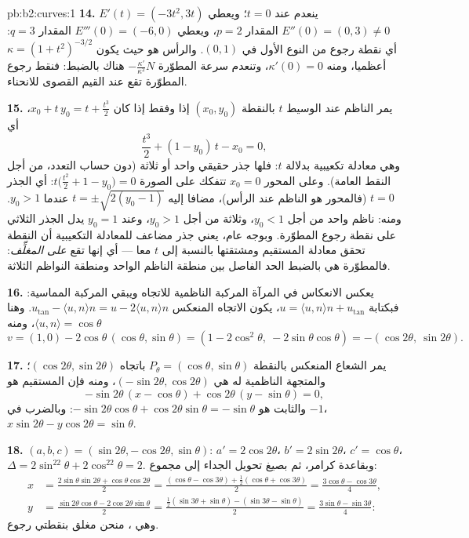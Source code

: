 \begin{solution}{pb:b2:curves:1}
\textbf{14.} $E'(t) = (-3t^2, 3t)$ ينعدم عند $t = 0$؛ ويعطي $E''(0) = (0, 3) \neq 0$ المقدار $p = 2$،
ويعطي $E'''(0) = (-6,
0)$ المقدار $q = 3$: أي نقطة رجوع من النوع الأول في $(0, 1)$.
والرأس هو حيث يكون $\kappa = (1+t^2)^{-3/2}$ أعظميا، ومنه $\kappa'(0) = 0$، وتنعدم سرعة المطوّرة
$-\frac{\kappa'}{\kappa^2}N$ هناك بالضبط: فنقط رجوع المطوّرة تقع عند القيم القصوى
للانحناء.

\textbf{15.} يمر الناظم عند الوسيط $t$ بالنقطة $(x_0, y_0)$ إذا وفقط
إذا كان $x_0 + t\,y_0 = t + \tfrac{t^3}2$، أي
\[
\frac{t^3}2 + (1 - y_0)\,t - x_0 = 0 ,
\]
وهي معادلة تكعيبية بدلالة $t$: فلها جذر حقيقي واحد أو ثلاثة
(دون حساب التعدد، من أجل النقط العامة). وعلى المحور $x_0 = 0$ تتفكك
على الصورة $t\bigl(\tfrac{t^2}2 + 1 - y_0\bigr) = 0$: أي الجذر $t = 0$ (فالمحور هو الناظم عند الرأس)،
مضافا إليه $t = \pm\sqrt{2(y_0 - 1)}$ عندما $y_0 > 1$. ومنه: ناظم واحد من أجل $y_0 < 1$،
وثلاثة من أجل $y_0 > 1$، وعند $y_0 = 1$ يدل الجذر الثلاثي على نقطة رجوع
المطوّرة. وبوجه عام، يعني جذر مضاعف للمعادلة التكعيبية أن النقطة
تحقق معادلة المستقيم ومشتقتها بالنسبة إلى $t$ معا --- أي إنها
تقع \emph{على المغلِّف}: فالمطوّرة هي بالضبط الحد الفاصل بين منطقة
الناظم الواحد ومنطقة النواظم الثلاثة.

\textbf{16.} يعكس الانعكاس في المرآة المركبة الناظمية للاتجاه ويبقي
المركبة المماسية: فبكتابة $u = \langle u, n\rangle n + u_{\mathrm{tan}}$، يكون الاتجاه المنعكس $u_{\mathrm{tan}} - \langle u,
n\rangle n = u - 2\langle u, n\rangle n$. وهنا
$\langle u,
n\rangle = \cos\theta$، ومنه
\[
v = (1, 0) - 2\cos\theta\,(\cos\theta, \sin\theta)
= (1 - 2\cos^2\theta,\ -2\sin\theta\cos\theta)
= -(\cos2\theta,\ \sin2\theta).
\]

\textbf{17.} يمر الشعاع المنعكس بالنقطة $P_\theta =
(\cos\theta, \sin\theta)$ باتجاه $(\cos2\theta,
\sin2\theta)$؛
والمتجهة الناظمية له هي $(-\sin2\theta,
\cos2\theta)$، ومنه فإن المستقيم هو
\[
-\sin2\theta\,(x - \cos\theta) + \cos2\theta\,(y -
\sin\theta) = 0,
\]
والثابت هو $-\sin2\theta\cos\theta +
\cos2\theta\sin\theta = -\sin\theta$: وبالضرب في $-1$، $x\sin2\theta - y\cos2\theta = \sin\theta$.

\textbf{18.} $(a, b, c) = (\sin2\theta, -\cos2\theta,
\sin\theta)$: $a' = 2\cos2\theta$، $b' = 2\sin2\theta$، $c' =
\cos\theta$، $\Delta = 2\sin^22\theta + 2\cos^22\theta = 2$.
وبقاعدة كرامر، ثم بصيغ تحويل الجداء إلى مجموع:
\begin{align*}
x &= \frac{2\sin\theta\sin2\theta +
\cos\theta\cos2\theta}{2}
= \frac{(\cos\theta - \cos3\theta) + \frac12(\cos\theta +
\cos3\theta)}{2} = \frac{3\cos\theta - \cos3\theta}4,\\
y &= \frac{\sin2\theta\cos\theta - 2\cos2\theta\sin\theta}2
= \frac{\frac12(\sin3\theta + \sin\theta) - (\sin3\theta -
\sin\theta)}2 = \frac{3\sin\theta - \sin3\theta}4 :
\end{align*}
وهي ، منحن مغلق بنقطتي رجوع.


\end{solution}
